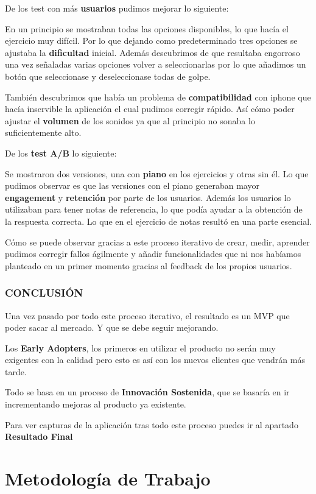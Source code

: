 \documentclass[12pt,twoside,titlepage]{report}
\begin{document}
De los test con más \textbf{usuarios} pudimos mejorar lo siguiente:

En un principio se mostraban todas las opciones disponibles, lo que hacía el ejercicio muy difícil. Por lo que dejando como predeterminado tres opciones se ajustaba la \textbf{dificultad} inicial. Además descubrimos de que resultaba engorroso una vez señaladas varias opciones volver a seleccionarlas por lo que añadimos un botón que seleccionase y deseleccionase todas de golpe.

También descubrimos que había un problema de \textbf{compatibilidad} con iphone que hacía inservible la aplicación el cual pudimos corregir rápido. Así cómo poder ajustar el \textbf{volumen} de los sonidos ya que al principio no sonaba lo suficientemente alto.

De los \textbf{test A/B} lo siguiente:

Se mostraron dos versiones, una con \textbf{piano} en los ejercicios y otras sin él. Lo que pudimos observar es que las versiones con el piano generaban mayor \textbf{engagement} y \textbf{retención} por parte de los usuarios. Además los usuarios lo utilizaban para tener notas de referencia, lo que podía ayudar a la obtención de la respuesta correcta. Lo que en el ejercicio de notas resultó en una parte esencial.

Cómo se puede observar gracias a este proceso iterativo de crear, medir, aprender pudimos corregir fallos ágilmente y añadir funcionalidades que ni nos habíamos planteado en un primer momento gracias al feedback de los propios usuarios.

\subsubsection{CONCLUSIÓN}

Una vez pasado por todo este proceso iterativo, el resultado es un MVP que poder sacar al mercado. Y que se debe seguir mejorando. 

Los \textbf{Early Adopters}, los primeros en utilizar el producto no serán muy exigentes con la calidad pero esto es así con los nuevos clientes que vendrán más tarde. 

Todo se basa en un proceso de \textbf{Innovación Sostenida}, que se basaría en ir incrementando mejoras al producto ya existente.

Para ver capturas de la aplicación tras todo este proceso puedes ir al apartado \textbf{Resultado Final}

\section{Metodología de Trabajo}
\end{document}

